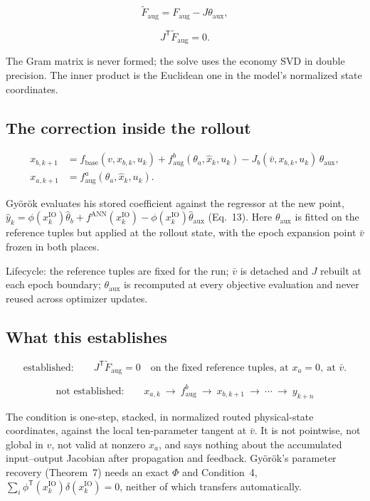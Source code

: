 \documentclass[12pt]{article}
\newcommand{\T}{\mathsf{T}}
\newcommand{\fbase}{f_{\mathrm{base}}}
\newcommand{\faug}{f_{\mathrm{aug}}}
\newcommand{\Faug}{F_{\mathrm{aug}}}
\newcommand{\ANN}{\mathrm{ANN}}
\newcommand{\xio}{x_k^{\mathrm{IO}}}
\newcommand{\thaux}{\theta_{\mathrm{aux}}}
\newcommand{\panel}[1]{\subsection*{\Large #1}\vspace{1mm}}
\begin{document}
\vspace{-2mm}
\begin{equation*}
\widetilde\Faug=\Faug-J\thaux,
\tag{cf.\ Eq.~10}
\end{equation*}

\vspace{-2mm}
\begin{equation*}
J^{\T}\widetilde\Faug=0 .
\tag{cf.\ Eq.~11}
\end{equation*}

The Gram matrix is never formed; the solve uses the economy SVD in double
precision. The inner product is the Euclidean one in the model's normalized
state coordinates.

\newpage
\panel{The correction inside the rollout}

\begin{equation*}
\begin{aligned}
x_{b,k+1}&=\fbase(v,x_{b,k},u_k)+\faug^{b}(\theta_a,\widehat x_k,u_k)
-J_b(\bar v,x_{b,k},u_k)\,\thaux,\\[1mm]
x_{a,k+1}&=\faug^{a}(\theta_a,\widehat x_k,u_k).
\end{aligned}
\end{equation*}

Gy\"or\"ok evaluates his stored coefficient against the regressor at the new
point, $\widehat y_k=\phi(\xio)\widehat\theta_b+f^{\ANN}(\xio)
-\phi(\xio)\widehat\thaux$ (Eq.~13). Here $\thaux$ is fitted on the reference
tuples but applied at the rollout state, with the epoch expansion point
$\bar v$ frozen in both places.

\vspace{1mm}
Lifecycle: the reference tuples are fixed for the run; $\bar v$ is detached and
$J$ rebuilt at each epoch boundary; $\thaux$ is recomputed at every objective
evaluation and never reused across optimizer updates.

\newpage
\panel{What this establishes}

\begin{equation*}
\text{established:}\qquad
J^{\T}\widetilde\Faug=0
\quad\text{on the fixed reference tuples, at }x_a=0,\ \text{at }\bar v .
\end{equation*}

\begin{equation*}
\text{not established:}\qquad
x_{a,k}\ \longrightarrow\ \faug^{b}
\ \longrightarrow\ x_{b,k+1}
\ \longrightarrow\ \cdots\ \longrightarrow\ y_{k+n}
\end{equation*}

The condition is one-step, stacked, in normalized routed physical-state
coordinates, against the local ten-parameter tangent at $\bar v$. It is not
pointwise, not global in $v$, not valid at nonzero $x_a$, and says nothing
about the accumulated input--output Jacobian after propagation and feedback.
Gy\"or\"ok's parameter recovery (Theorem~7) needs an exact $\Phi$ and
Condition~4, $\sum_i\phi^{\T}(\xio)\delta(\xio)=0$, neither of which transfers
automatically.
\end{document}
